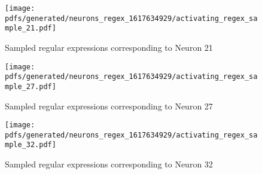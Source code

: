 \newpage

\begin{figure}[t!]
  \centering
  \texttt{[image: pdfs/generated/neurons\_regex\_1617634929/activating\_regex\_sample\_21.pdf]}
  \caption{Sampled regular expressions corresponding to Neuron 21}
  \label{fig:regex_example_neuron_21}
\end{figure}

\begin{figure}[t!]
  \centering
  \texttt{[image: pdfs/generated/neurons\_regex\_1617634929/activating\_regex\_sample\_27.pdf]}
  \caption{Sampled regular expressions corresponding to Neuron 27}
  \label{fig:regex_example_neuron_27}
\end{figure}

\begin{figure}[t!]
  \centering
  \texttt{[image: pdfs/generated/neurons\_regex\_1617634929/activating\_regex\_sample\_32.pdf]}
  \caption{Sampled regular expressions corresponding to Neuron 32}
  \label{fig:regex_example_neuron_32}
\end{figure}

\clearpage

